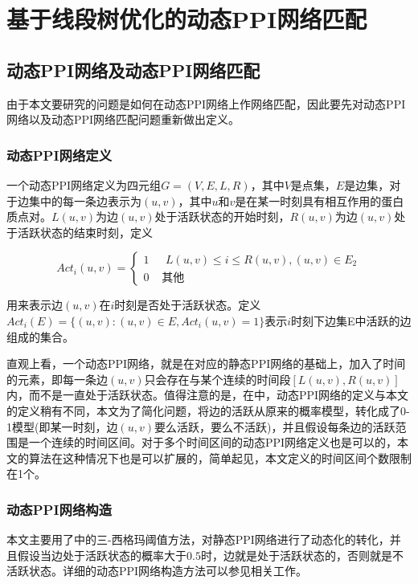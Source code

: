 \renewcommand{\algorithmicrequire}{\textbf{Input:}}
\renewcommand{\algorithmicensure}{\textbf{Output:}}
\chapter{基于线段树优化的动态PPI网络匹配}
\section{动态PPI网络及动态PPI网络匹配}
由于本文要研究的问题是如何在动态PPI网络上作网络匹配，因此要先对动态PPI网络以及动态PPI网络匹配问题重新做出定义。

\subsection{动态PPI网络定义}
一个动态PPI网络定义为四元组$G=(V,E,L,R)$，其中$V$是点集，$E$是边集，对于边集中的每一条边表示为$(u,v)$，其中$u$和$v$是在某一时刻具有相互作用的蛋白质点对。$L(u,v)$为边$(u,v)$处于活跃状态的开始时刻，$R(u,v)$为边$(u,v)$处于活跃状态的结束时刻，定义

\begin{equation}\label{myworkactivedefine}
Act_i(u,v)=\begin{cases}
1 & \text{  } L(u,v)\leq i\leq R(u,v), (u,v)\in E_2\\ 
0 & \text{  其他}  
\end{cases}
\end{equation}

用来表示边$(u,v)$在$i$时刻是否处于活跃状态。定义$Act_i(E)=\{(u,v):(u,v)\in E,Act_i(u,v)=1\}$表示$i$时刻下边集E中活跃的边组成的集合。

直观上看，一个动态PPI网络，就是在对应的静态PPI网络的基础上，加入了时间的元素，即每一条边$(u,v)$只会存在与某个连续的时间段$[L(u,v),R(u,v)]$内，而不是一直处于活跃状态。值得注意的是，在\cite{zhang2016method}中，动态PPI网络的定义与本文的定义稍有不同，本文为了简化问题，将边的活跃从原来的概率模型，转化成了0-1模型(即某一时刻，边$(u,v)$要么活跃，要么不活跃)，并且假设每条边的活跃范围是一个连续的时间区间。对于多个时间区间的动态PPI网络定义也是可以的，本文的算法在这种情况下也是可以扩展的，简单起见，本文定义的时间区间个数限制在1个。

\subsection{动态PPI网络构造}
本文主要用了\cite{zhang2016method}中的三-西格玛阈值方法，对静态PPI网络进行了动态化的转化，并且假设当边处于活跃状态的概率大于$0.5$时，边就是处于活跃状态的，否则就是不活跃状态。详细的动态PPI网络构造方法可以参见相关工作。

